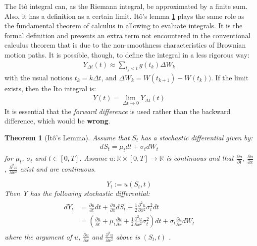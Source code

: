 \documentclass[12pt,twoside]{reedthesis}
\newtheorem{theorem}{Theorem}[section]
\theoremstyle{definition}
\theoremstyle{definition}
\theoremstyle{remark}
\begin{document}
  The Itô integral can, as the Riemann integral, be approximated by a
  finite sum. Also, it has a definition as a certain limit. Itô's lemma
  \ref{itolemma} plays the same role as the fundamental theorem of
  calculus in allowing to evaluate integrals. It is the formal definition
  and presents an extra term not encountered in the conventional calculus
  theorem that is due to the non-smoothness characteristics of Brownian
  motion paths. It is possible, though, to define the integral in a less
  rigorous way:
  \begin{align}
  Y_{\Delta t}(t) \approx \sum_{t_k < t}{g(t_k)\Delta W_k}
  \end{align}
  \noindent
  with the usual notions \(t_k = k\Delta t\), and
  \(\Delta W_k = W(t_{k+1})-W(t_k))\). If the limit exists, then the Ito
  integral is:
  \begin{align}
  Y(t)  = \lim\limits_{\Delta t \to 0} Y_{\Delta t}(t)
  \end{align}
  It is essential that the \emph{forward difference} is used rather than
  the backward difference, which would be \textbf{wrong}.
  \begin{theorem}[Itô's Lemma] \label{itolemma}
  Assume that $S_t$ has a stochastic differential given by:
  \begin{align}
  dS_t = \mu_t dt + \sigma_t dW_t 
  \end{align}
  \noindent
  for $\mu_t$, $\sigma_t$ and $t \in [0,T]$. Assume $u: \mathbb{R} \times [0, T] \rightarrow \mathbb{R}$ is continuous and that $\frac{\partial u}{\partial t}$, $\frac{\partial u}{\partial x}$, $\frac{\partial^2 u}{\partial x^2}$ exist and are continuous.
  
  $$Y_t := u(S_t, t)$$
  \noindent
  Then Y has the following stochastic differential:
  \begin{align} 
  \label{eq:ito}
  \begin{split}
      dY_t &= \frac{\partial u}{\partial t}dt + \frac{\partial u}{\partial x} dS_t + \frac{1}{2}\frac{\partial^2 u}{\partial x^2}\sigma_t^2 dt  \\[10pt] 
      &= \left( \frac{\partial u}{\partial t} + \mu_t \frac{\partial u}{\partial x} + \frac{1}{2}\frac{\partial^2 u}{\partial x^2}\sigma_t^2 \right) dt + \sigma_t \frac{\partial u}{\partial x} dW_t
  \end{split}
  \end{align}
  \noindent 
  where the argument of $u$, $\frac{\partial u}{\partial x}$ and $\frac{\partial^2 u}{\partial x^2}$ above is $\left( S_t, t \right)$ .
  \end{theorem}
\end{document}
